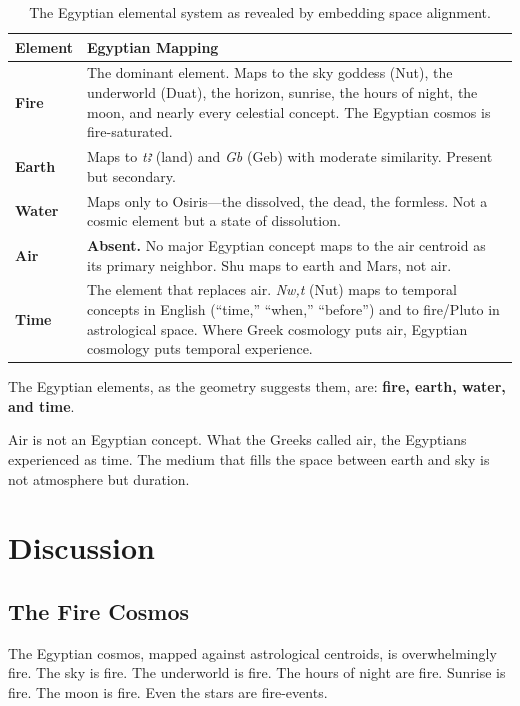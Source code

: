 \documentclass[11pt, a4paper]{article}
\begin{document}
\begin{table}[H]
\centering
\begin{tabular}{lp{3.5in}}
\toprule
\textbf{Element} & \textbf{Egyptian Mapping} \\
\midrule
\textbf{Fire} & The dominant element. Maps to the sky goddess (Nut), the underworld (Duat), the horizon, sunrise, the hours of night, the moon, and nearly every celestial concept. The Egyptian cosmos is fire-saturated. \\
\textbf{Earth} & Maps to \textit{tꜣ} (land) and \textit{Gb} (Geb) with moderate similarity. Present but secondary. \\
\textbf{Water} & Maps only to Osiris---the dissolved, the dead, the formless. Not a cosmic element but a state of dissolution. \\
\textbf{Air} & \textbf{Absent.} No major Egyptian concept maps to the air centroid as its primary neighbor. Shu maps to earth and Mars, not air. \\
\midrule
\textbf{Time} & The element that replaces air. \textit{Nw,t} (Nut) maps to temporal concepts in English (``time,'' ``when,'' ``before'') and to fire/Pluto in astrological space. Where Greek cosmology puts air, Egyptian cosmology puts temporal experience. \\
\bottomrule
\end{tabular}
\caption{The Egyptian elemental system as revealed by embedding space alignment.}
\end{table}

The Egyptian elements, as the geometry suggests them, are: \textbf{fire, earth, water, and time}.

Air is not an Egyptian concept. What the Greeks called air, the Egyptians experienced as time. The medium that fills the space between earth and sky is not atmosphere but duration.

\section{Discussion}
\label{sec:discussion}

\subsection{The Fire Cosmos}

The Egyptian cosmos, mapped against astrological centroids, is overwhelmingly fire. The sky is fire. The underworld is fire. The hours of night are fire. Sunrise is fire. The moon is fire. Even the stars are fire-events.
\end{document}
